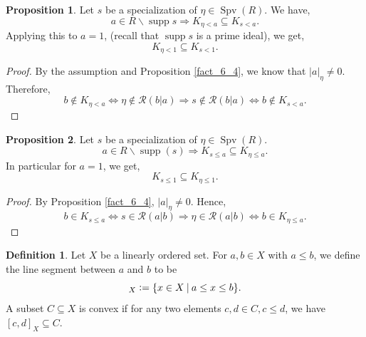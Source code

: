 \documentclass[10pt]{article}
\numberwithin{equation}{section}
\theoremstyle{definition}
\newtheorem{proposition}{Proposition}[subsection]
\newtheorem{definition}{Definition}[subsection]
\DeclareMathOperator{\supp}{supp}
\DeclareMathOperator{\Spv}{Spv}
\newcommand{\defeq}{\vcentcolon=}
\newcommand{\cR}[0]{\mathcal{R}}
\newcommand{\sep}[0]{\:|\:}
\newcommand{\ab}[1]{\vert #1 \vert}
\begin{document}
\begin{proposition}
    \label{fact_6_6}
    Let $s$ be a specialization of $\eta\in\Spv(R)$. We have,
    \begin{equation*}
        a\in R\backslash\supp s\Rightarrow K_{\eta<a}\subseteq K_{s<a}.
    \end{equation*}
    Applying this to $a=1$, (recall that $\supp s$ is a prime ideal), we get,
    \begin{equation*}
        K_{\eta<1}\subseteq K_{s<1}.
    \end{equation*}
\end{proposition}

\begin{proof}
    By the assumption and Proposition \ref{fact_6_4}, we know that $\ab{a}_\eta\not=0$. Therefore,
    \begin{equation*}
        b\not\in K_{\eta<a}\iff\eta\not\in\cR(b|a)\Rightarrow s\not\in \cR(b|a)\iff b\not\in K_{s<a}.
    \end{equation*}
\end{proof}
\begin{proposition}
    \label{fact_6_7}
    Let $s$ be a specialization of $\eta\in\Spv(R)$.
    \begin{equation*}
        a\in R\backslash\supp(s)\Rightarrow K_{s\leq a}\subseteq K_{\eta\leq a}.
    \end{equation*}
    In particular for $a=1$, we get,
    \begin{equation*}
        K_{s\leq 1}\subseteq K_{\eta\leq 1}.
    \end{equation*}
\end{proposition}

\begin{proof}
    By Proposition \ref{fact_6_4}, $\ab{a}_\eta\not=0$. Hence,
    \begin{equation*}
        b\in K_{s\leq a}\iff s\in \cR(a|b)\Rightarrow \eta\in\cR(a|b)\iff b\in K_{\eta\leq a}.
    \end{equation*}
\end{proof}
\begin{definition}
    \label{definition_6_8}
    Let $X$ be a linearly ordered set. For $a,b\in X$ with $a\leq b$, we define the line segment between $a$ and $b$ to be
    \begin{equation*}
        [a,b]_X \defeq\{x\in X\sep a\leq x\leq b\}.
    \end{equation*}
    A subset $C\subseteq X$ is convex if for any two elements $c,d\in C,c\leq d$, we have $[ c,d]_X\subseteq C$.
\end{definition}
\end{document}
